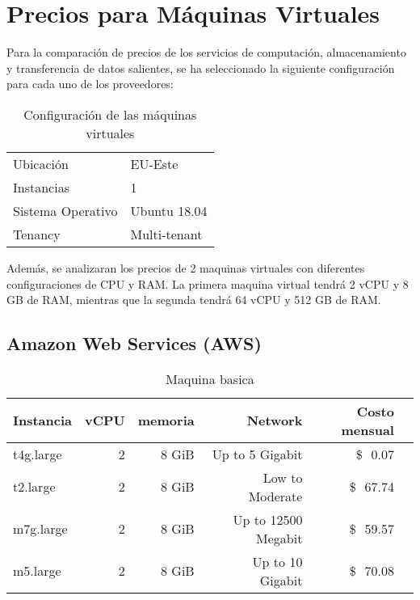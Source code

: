 \documentclass{article}
\newcommand{\usd}[1]{\SI{#1}[\$\ensuremath{\,}]{}}
\begin{document}
\newpage

\section{Precios para Máquinas Virtuales}

Para la comparación de precios de los servicios de computación, almacenamiento y transferencia de datos salientes, se ha seleccionado la siguiente configuración para cada uno de los proveedores:

\begin{table}[!htp]
  \centering
  \caption{Configuración de las máquinas virtuales}
  \label{tab:configuracion}
  \begin{tabular}{|l|l|}
    \toprule
    Ubicación & EU-Este \\
    Instancias & 1 \\
    Sistema Operativo & Ubuntu 18.04 \\
    Tenancy & Multi-tenant \\
    \bottomrule

  \end{tabular}
\end{table}

Además, se analizaran los precios de 2 maquinas virtuales con diferentes configuraciones de CPU y RAM.
La primera maquina virtual tendrá 2 vCPU y 8 GB de RAM, mientras que la segunda tendrá 64 vCPU y 512 GB de RAM.



  \subsection{Amazon Web Services (AWS)}


  \begin{table}[!htp]\centering
\caption{Maquina basica}\label{tab:MV_Basica_AWS}
\scriptsize
\begin{tabular}{lrrrrr}\toprule
Instancia &vCPU &memoria &Network &Costo mensual\\\midrule
  t4g.large &2 &8 GiB &Up to 5 Gigabit &\usd{0.07} \\
  t2.large &2 &8 GiB &Low to Moderate &\usd{67.74} \\
  m7g.large &2 &8 GiB &Up to 12500 Megabit &\usd{59.57} \\
  m5.large &2 &8 GiB &Up to 10 Gigabit &\usd{70.08} \\
\bottomrule
\end{tabular}
\end{table}
\end{document}
